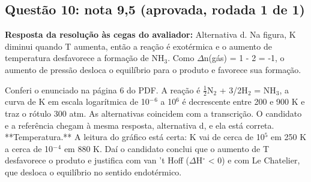 \documentclass{article}%
\begin{document}
\subsection*{Questão 10: nota 9,5 (aprovada, rodada 1 de 1)}%
\textbf{Resposta da resolução às cegas do avaliador:} Alternativa d. Na figura, K diminui quando T aumenta, então a reação é exotérmica e o aumento de temperatura desfavorece a formação de NH$_{3}$. Como $\Delta$n(gás) = 1 - 2 = -1, o aumento de pressão desloca o equilíbrio para o produto e favorece sua formação.\par %
Conferi o enunciado na página 6 do PDF. A reação é $\frac12$N$_{2}$ + 3/2H$_{2}$ = NH$_{3}$, a curva de K em escala logarítmica de 10$^{-}$$^{6}$ a 10$^{6}$ é decrescente entre 200 e 900 K e traz o rótulo 300 atm. As alternativas coincidem com a transcrição.\newline%
\newline%
O candidato e a referência chegam à mesma resposta, alternativa d, e ela está correta.\newline%
\newline%
**Temperatura.** A leitura do gráfico está certa: K vai de cerca de 10$^{5}$ em 250 K a cerca de 10$^{-}$$^{4}$ em 880 K. Daí o candidato conclui que o aumento de T desfavorece o produto e justifica com van 't Hoff ($\Delta$H$^\circ$ < 0) e com Le Chatelier, que desloca o equilíbrio no sentido endotérmico.\newline%
\newline%
\end{document}

